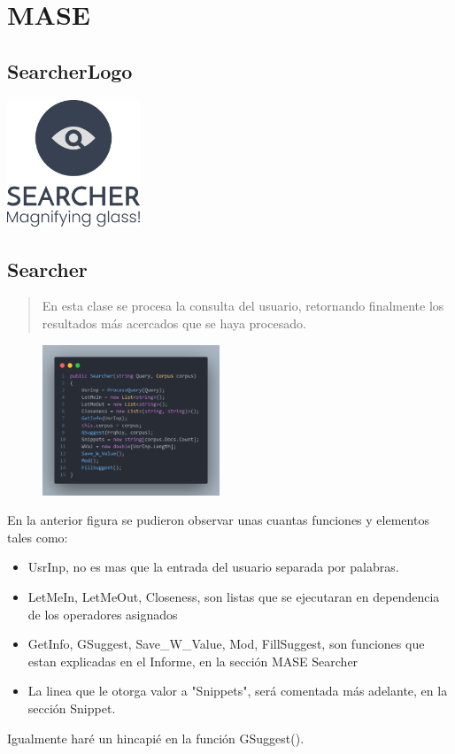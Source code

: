 \section*{MASE}

\subsection*{SearcherLogo}
\begin{frame}
    \centering %
    \includegraphics[width=150px]{Assets/searcher_logo.png}
\end{frame}

\subsection*{Searcher}
    \begin{frame}
        \begin{abstract}
            En esta clase se procesa la consulta del usuario, retornando finalmente los resultados más acercados que se haya procesado.
        \end{abstract}
        \begin{figure}
            \includegraphics[width=200px]{Assets/searcher_builder.png}
        \end{figure}
    \end{frame}

    \begin{frame}
        En la anterior figura se pudieron observar unas cuantas funciones y elementos tales como:
        \begin{itemize}
            \item UsrInp, no es mas que la entrada del usuario separada por palabras.
            \item LetMeIn, LetMeOut, Closeness, son listas que se ejecutaran en dependencia de los operadores asignados
            \item GetInfo, GSuggest, Save\_W\_Value, Mod, FillSuggest, son funciones que estan explicadas en el Informe, en la sección MASE Searcher
            \item La linea que le otorga valor a "Snippets", será comentada más adelante, en la sección Snippet.
        \end{itemize}
        Igualmente haré un hincapié en la función GSuggest().
    \end{frame}

